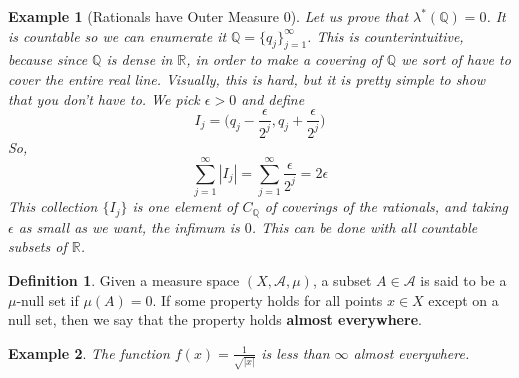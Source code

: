 \documentclass{article}
\newtheorem{example}{Example}[section]
\theoremstyle{remark}
\theoremstyle{definition}
\newtheorem{definition}{Definition}[section]
\begin{document}
\begin{example}[Rationals have Outer Measure $0$]
Let us prove that $\lambda^*(\mathbb{Q}) = 0$. It is countable so we can enumerate it $\mathbb{Q} = \{ q_j\}_{j=1}^\infty$. This is counterintuitive, because since $\mathbb{Q}$ is dense in $\mathbb{R}$, in order to make a covering of $\mathbb{Q}$ we sort of have to cover the entire real line. Visually, this is hard, but it is pretty simple to show that you don't have to. We pick $\epsilon > 0$ and define 
\[I_j = \big( q_j - \frac{\epsilon}{2^j} , q_j + \frac{\epsilon}{2^j} \big)\]
So, 
\[\sum_{j=1}^\infty |I_j| = \sum_{j=1}^\infty \frac{\epsilon}{2^j} = 2 \epsilon\]
This collection $\{I_j\}$ is one element of $C_\mathbb{Q}$ of coverings of the rationals, and taking $\epsilon$ as small as we want, the infimum is $0$. This can be done with all countable subsets of $\mathbb{R}$. 
\end{example}

\begin{definition}
Given a measure space $(X, \mathcal{A}, \mu)$, a subset $A \in \mathcal{A}$ is said to be a $\mu$-null set if $\mu(A) = 0$. If some property holds for all points $x \in X$ except on a null set, then we say that the property holds \textbf{almost everywhere}.
\end{definition}

\begin{example}
The function $f(x) = \frac{1}{\sqrt{|x|}}$ is less than $\infty$ almost everywhere. 
\end{example}
\end{document}
